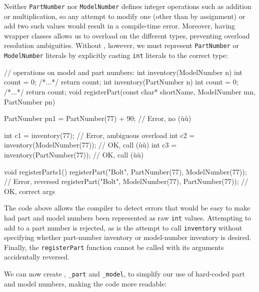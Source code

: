 \noindent Neither \lstinline!PartNumber! nor \lstinline!ModelNumber! defines integer
operations such as addition or multiplication, so any attempt to modify
one (other than by assignment) or add two such values would result in a
compile-time error. Moreover, having wrapper classes allows us to
overload on the different types, preventing overload resolution
ambiguities. Without , however, we must represent
\lstinline!PartNumber! or \lstinline!ModelNumber! literals by explicitly
casting \lstinline!int! literals to the correct type:

\begin{emcppslisting}[emcppsbatch=e14]
// operations on model and part numbers:
int inventory(ModelNumber n) { int count = 0; /*...*/ return count; }
int inventory(PartNumber n)  { int count = 0; /*...*/ return count; }
void registerPart(const char* shortName, ModelNumber mn, PartNumber pn) { }

PartNumber pn1 = PartNumber(77) + 90;  // Error, no (ù{}ù)

int c1 = inventory(77);               // Error, ambiguous overload
int c2 = inventory(ModelNumber(77));  // OK, call (ù{}ù)
int c3 = inventory(PartNumber(77));   // OK, call (ù{}ù)

void registerParts1()
{
    registerPart("Bolt", PartNumber(77), ModelNumber(77));  // Error, reversed
    registerPart("Bolt", ModelNumber(77), PartNumber(77));  // OK, correct args
}
\end{emcppslisting}

\noindent The code above allows the compiler to detect errors that
would be easy to make had part and model numbers been represented as raw
\lstinline!int! values. Attempting to add to a part number is rejected,
as is the attempt to call \lstinline!inventory! without specifying whether
part-number inventory or model-number inventory is desired. Finally, the
\lstinline!registerPart! function cannot be called with its arguments
accidentally reversed.

We can now create , \lstinline!_part! and
\lstinline!_model!, to simplify our use of hard-coded part and model
numbers, making the code more readable:

